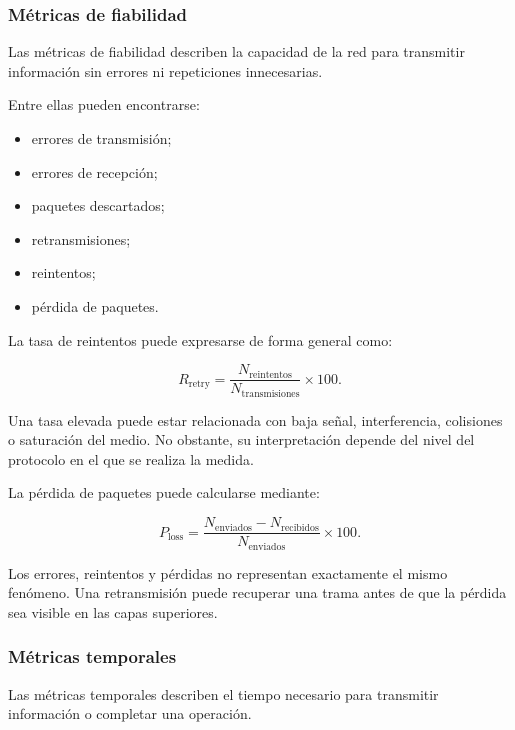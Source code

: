 \subsubsection*{Métricas de fiabilidad}

Las métricas de fiabilidad describen la capacidad de la red para
transmitir información sin errores ni repeticiones innecesarias.

Entre ellas pueden encontrarse:

\begin{itemize}
    \item errores de transmisión;

    \item errores de recepción;

    \item paquetes descartados;

    \item retransmisiones;

    \item reintentos;

    \item pérdida de paquetes.
\end{itemize}

La tasa de reintentos puede expresarse de forma general como:

\[
    R_{\mathrm{retry}}
    =
    \frac{
        N_{\mathrm{reintentos}}
    }{
        N_{\mathrm{transmisiones}}
    }
    \times
    100.
\]

Una tasa elevada puede estar relacionada con baja señal, interferencia,
colisiones o saturación del medio. No obstante, su interpretación depende
del nivel del protocolo en el que se realiza la medida.

La pérdida de paquetes puede calcularse mediante:

\[
    P_{\mathrm{loss}}
    =
    \frac{
        N_{\mathrm{enviados}}
        -
        N_{\mathrm{recibidos}}
    }{
        N_{\mathrm{enviados}}
    }
    \times
    100.
\]

Los errores, reintentos y pérdidas no representan exactamente el mismo
fenómeno. Una retransmisión puede recuperar una trama antes de que la
pérdida sea visible en las capas superiores.


\subsubsection*{Métricas temporales}

Las métricas temporales describen el tiempo necesario para transmitir
información o completar una operación.

